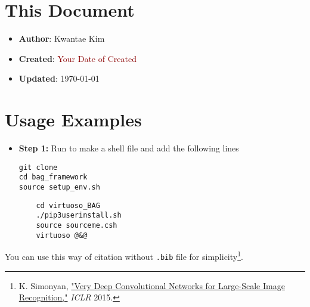 \documentclass[a4paper,12pt]{article}
\begin{document}
\section*{This Document}

\begin{itemize}
    \item \textbf{Author}: Kwantae Kim
    \item \textbf{Created}: \textcolor{darkred}{Your Date of Created}
    \item \textbf{Updated}: \today
\end{itemize}

\tableofcontents

\pagebreak


\section{Usage Examples}

\begin{itemize}
    \item[\footnotesize\faCode] \textbf{Step 1:} Run  to make a shell file and add the following lines
          \vspace{-1em}\begin{verbatim}
git clone
cd bag_framework
source setup_env.sh
        \end{verbatim}
          \vspace{-1em}\begin{verbatim}
    cd virtuoso_BAG
    ./pip3userinstall.sh
    source sourceme.csh
    virtuoso @&@
        \end{verbatim}
\end{itemize}

You can use this way of citation without \texttt{.bib} file for simplicity\footnote{K. Simonyan, \href{https://arxiv.org/abs/1409.1556}{"Very Deep Convolutional Networks for Large-Scale Image Recognition,"} \textit{ICLR} 2015.}.

\label{lastpage}        %
\end{document}
